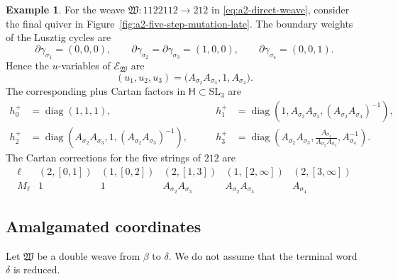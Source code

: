 \documentclass[10pt,a4paper]{article}
\theoremstyle{definition}
\newtheorem{example}[theorem]{Example}
\theoremstyle{remark}
\newcommand{\torusH}{\mathsf{H}}
\newcommand{\fW}{\mathfrak W}
\begin{document}
\begin{example}
For the weave \(\fW:1122112\to212\) in \eqref{eq:a2-direct-weave}, consider
the final quiver in Figure~\ref{fig:a2-five-step-mutation-late}.  The boundary weights of
the Lusztig cycles are
\[
 \partial\gamma_{\sigma_1}=(0,0,0),\qquad
 \partial\gamma_{\sigma_2}=\partial\gamma_{\sigma_3}=(1,0,0),\qquad
 \partial\gamma_{\sigma_4}=(0,0,1).
\]
Hence the \(u\)-variables of \(\mathcal E_\fW\) are
\[
 (u_1,u_2,u_3)
 =\bigl(A_{\sigma_2}A_{\sigma_3},1,A_{\sigma_4}\bigr).
\]
The corresponding plus Cartan factors in \(\torusH\subset\mathrm{SL}_3\) are
\[
\begin{alignedat}{2}
 h_0^+&=\operatorname{diag}(1,1,1),\qquad&
 h_1^+&=\operatorname{diag}\left(
  1,A_{\sigma_2}A_{\sigma_3},
  (A_{\sigma_2}A_{\sigma_3})^{-1}\right),\\
 h_2^+&=\operatorname{diag}\left(
  A_{\sigma_2}A_{\sigma_3},1,
  (A_{\sigma_2}A_{\sigma_3})^{-1}\right),\qquad&
 h_3^+&=\operatorname{diag}\left(
  A_{\sigma_2}A_{\sigma_3},
  \frac{A_{\sigma_4}}{A_{\sigma_2}A_{\sigma_3}},
  A_{\sigma_4}^{-1}\right).
\end{alignedat}
\]
The Cartan corrections for the five strings of \(212\) are
\[
\begin{array}{c|ccccc}
 \ell
 &(2,[0,1])&(1,[0,2])&(2,[1,3])&(1,[2,\infty])&(2,[3,\infty])\\ \hline
 M_\ell
 &1&1&A_{\sigma_2}A_{\sigma_3}&A_{\sigma_2}A_{\sigma_3}&A_{\sigma_4}
\end{array}
\]
\end{example}

\subsection{Amalgamated coordinates}

Let \(\fW\) be a double weave from \(\beta\) to \(\delta\).  We do not
assume that the terminal word \(\delta\) is reduced.
\end{document}
